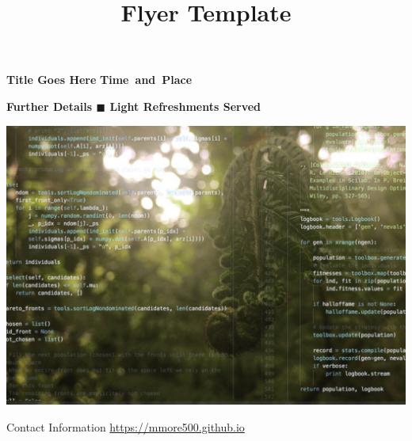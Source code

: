 \documentclass[12pt,letterpaper]{article}
\title{Flyer Template}
\begin{document}
{\fontsize{40pt}{42pt}\bfseries\selectfont\color{HighlightColor}%
Title Goes Here%
} \hfill {\LARGE\bfseries%
\mbox{Time and Place}%
}

\vspace{-2ex}


\begin{large}
\justify
{ \par}

\end{large}

{\LARGE\bfseries Further Details \hfill $\blacksquare$ \hfill Light Refreshments Served}\par%

{\centering%
\includegraphics[width=\linewidth]{postergraphic_cropped}%
\par}

\vfill

{\LARGE Contact Information}
\hfill
{\Large \url{https://mmore500.github.io}}
\end{document}
